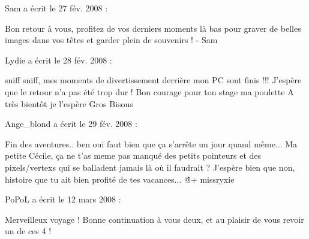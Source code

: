 \medskip
Sam a écrit le 27 fév. 2008 :
\begin{displayquote}
Bon retour à vous, profitez de vos derniers moments là bas pour graver de belles images dans vos têtes et garder plein de souvenirs !
- Sam
\end{displayquote}

\medskip
Lydie a écrit le 28 fév. 2008 :
\begin{displayquote}
sniff sniff, mes moments de divertissement derrière mon PC sont finis !!!
J'espère que le retour n'a pas été trop dur !
Bon courage pour ton stage ma poulette
A très bientôt je l'espère
Gros Bisous
\end{displayquote}

\medskip
Ange_blond a écrit le 29 fév. 2008 :
\begin{displayquote}
Fin des aventures.. ben oui faut bien que ça s'arrête un jour quand même...
Ma petite Cécile, ça ne t'as meme pas manqué des petits pointeurs et des pixels/vertexs qui se balladent jamais là où il faudrait ?
J'espère bien que non, histoire que tu ait bien profité de tes vacances... \^\^
@+ missryxie
\end{displayquote}

\medskip
PoPoL a écrit le 12 mars 2008 :
\begin{displayquote}
Merveilleux voyage ! Bonne continuation à vous deux, et au plaisir de vous revoir un de ces 4 !
\end{displayquote}
